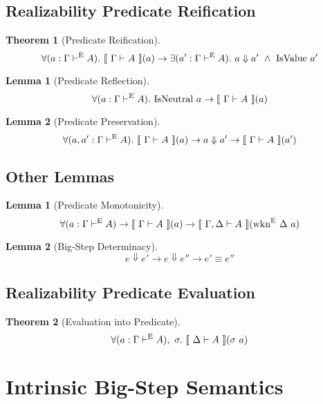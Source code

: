 \documentclass[preprint,nonatbib]{sigplanconf}
\numberwithin{subdefin}{defin}
\newtheorem{theorem}{Theorem}
\newtheorem{subtheorem}{Lemma}
\numberwithin{subtheorem}{theorem}
\newtheorem{lemma}{Lemma}
\def\bigstep{\Downarrow}
\def\marr{\rightarrow}
\newcommand{\turn}[1]{\vdash^\con{#1}}
\newcommand{\el}[1]{\llbracket ~ #1 ~ \rrbracket}
\newcommand{\wkne}[1]{\fun{wkn}^\con{E} ~ \Delta ~ #1}
\newcommand{\con}[1]{\textmd{#1}}
\newcommand{\fun}[1]{\textmd{#1}}
\newcommand{\typm}[1]{\el{\Gamma \vdash #1}}
\newcommand{\dtypm}[1]{\el{\Delta \vdash #1}}
\newcommand{\gdtypm}[1]{\el{\Gamma, \Delta \vdash #1}}
\newcommand{\type}[1]{\Gamma \turn{E} #1}
\begin{document}
\subsection{Realizability Predicate Reification}

\begin{theorem}[Predicate Reification]
\label{thm:pred:reify}
$$
\forall (a : \type{A}).~ \typm{A}(a) \marr
\exists (a' : \type{A}).~ a \bigstep a' ~ \wedge ~ \fun{IsValue} ~ a'
$$
\end{theorem}

\begin{subtheorem}[Predicate Reflection]
\label{lem:pred:refl}
$$
\forall (a : \type{A}).~ \fun{IsNeutral} ~ a \marr \typm{A}(a)
$$
\end{subtheorem}

\begin{subtheorem}[Predicate Preservation]
\label{lem:pred:pres}
$$
\forall (a, a' : \type{A}).~ \typm{A}(a) \marr 
a \bigstep a' \marr \typm{A}(a')
$$
\end{subtheorem}

\subsection{Other Lemmas}

\begin{lemma}[Predicate Monotonicity]
\label{lem:pred:mono}
$$
\forall (a : \type{A}) \marr \typm{A}(a) \marr \gdtypm{A}(\wkne{a})
$$
\end{lemma}

\begin{lemma}[Big-Step Determinacy]
\label{lem:pred:determ}
$$
e \bigstep e' \marr e \bigstep e'' \marr e' \equiv e''
$$
\end{lemma}

\subsection{Realizability Predicate Evaluation}

\begin{theorem}[Evaluation into Predicate]
\label{thm:pred:eval}
$$
\forall (a : \type{A}), ~ \sigma.~ \dtypm{A}(\sigma ~ a)
$$
\end{theorem}

\section{Intrinsic Big-Step Semantics}
\label{sec:emod}
\end{document}
